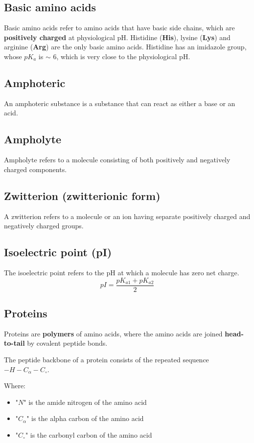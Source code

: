 \documentclass[11pt]{article}
\begin{document}
\subsection{Basic amino acids}
\label{sec:org5fd28b2}
Basic amino acids refer to amino acids that have basic side chains, which are \textbf{positively charged} at physiological pH. Histidine (\textbf{His}), lysine (\textbf{Lys}) and arginine (\textbf{Arg}) are the only basic amino acids. Histidine has an imidazole group, whose \(pK_a\) is \(\sim\) 6, which is very close to the physiological pH.
\subsection{Amphoteric}
\label{sec:org05b9e48}
An amphoteric substance is a substance that can react as either a base or an acid.
\subsection{Ampholyte}
\label{sec:orgb48882a}
Ampholyte refers to a molecule consisting of both positively and negatively charged components.
\subsection{Zwitterion (zwitterionic form)}
\label{sec:org6b4069b}
A zwitterion refers to a molecule or an ion having separate positively charged and negatively charged groups.
\subsection{Isoelectric point (pI)}
\label{sec:org5fad2f7}
The isoelectric point refers to the pH at which a molecule has zero net charge.
\[pI = \frac{pK_{a1} + pK_{a2}}{2}\]
\subsection{Proteins}
\label{sec:orgaef478d}
Proteins are \textbf{polymers} of amino acids, where the amino acids are joined \textbf{head-to-tail} by covalent peptide bonds.


The peptide backbone of a protein consists of the repeated sequence \(-H-C_{\alpha}-C_{\circ}\).

Where:
\begin{itemize}
\item "\(N\)" is the amide nitrogen of the amino acid
\item "\(C_{\alpha}\)" is the alpha carbon of the amino acid
\item "\(C_{\circ}\)" is the carbonyl carbon of the amino acid
\end{itemize}
\end{document}
